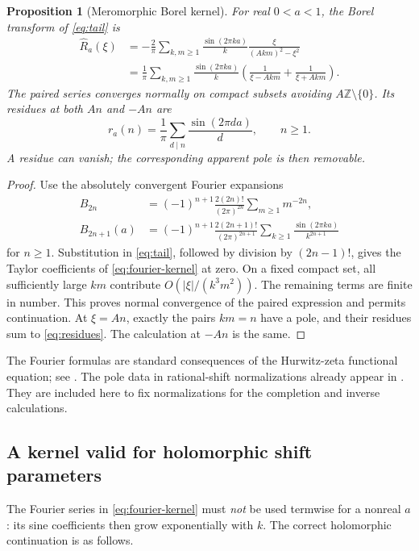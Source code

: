 \documentclass[11pt,a4paper]{article}
\numberwithin{equation}{section}
\newtheorem{proposition}[theorem]{Proposition}
\theoremstyle{definition}
\theoremstyle{remark}
\newcommand{\Z}{\mathbb Z}
\begin{document}
\begin{proposition}[Meromorphic Borel kernel]
\label{prop:borel}
For real $0<a<1$, the Borel transform of \eqref{eq:tail} is
\begin{align}
 \widehat R_a(\xi)
 &=-\frac2\pi\sum_{k,m\geq1}\frac{\sin(2\pi ka)}k
                  \frac{\xi}{(Akm)^2-\xi^2}\label{eq:fourier-kernel}\\
 &=\frac1\pi\sum_{k,m\geq1}\frac{\sin(2\pi ka)}k
      \left(\frac1{\xi-Akm}+\frac1{\xi+Akm}\right).
 \nonumber
\end{align}
The paired series converges normally on compact subsets avoiding
$A\Z\setminus\{0\}$. Its residues at both $An$ and $-An$ are
\begin{equation}
 r_a(n)=\frac1\pi\sum_{d\mid n}\frac{\sin(2\pi da)}d,
 \qquad n\geq1.
 \label{eq:residues}
\end{equation}
A residue can vanish; the corresponding apparent pole is then removable.
\end{proposition}
\begin{proof}
Use the absolutely convergent Fourier expansions
\begin{align*}
 B_{2n}&=(-1)^{n+1}\frac{2(2n)!}{(2\pi)^{2n}}
                \sum_{m\geq1}m^{-2n},\\
 B_{2n+1}(a)&=(-1)^{n+1}\frac{2(2n+1)!}{(2\pi)^{2n+1}}
                \sum_{k\geq1}\frac{\sin(2\pi ka)}{k^{2n+1}}
\end{align*}
for $n\geq1$. Substitution in \eqref{eq:tail}, followed by division by
$(2n-1)!$, gives the Taylor coefficients of \eqref{eq:fourier-kernel} at
zero. On a fixed compact set, all sufficiently large $km$ contribute
$O(|\xi|/(k^3m^2))$. The remaining terms are finite in number. This proves
normal convergence of the paired expression and permits continuation.
At $\xi=An$, exactly the pairs $km=n$ have a pole, and their residues sum
to \eqref{eq:residues}. The calculation at $-An$ is the same.
\end{proof}

The Fourier formulas are standard consequences of the Hurwitz-zeta
functional equation; see \cite{dlmfzeta}. The pole data in rational-shift
normalizations already appear in \cite{fr}. They are included here to fix
normalizations for the completion and inverse calculations.

\subsection{A kernel valid for holomorphic shift parameters}
The Fourier series in \eqref{eq:fourier-kernel} must \emph{not} be used
termwise for a nonreal $a$: its sine coefficients then grow exponentially
with $k$. The correct holomorphic continuation is as follows.
\end{document}
